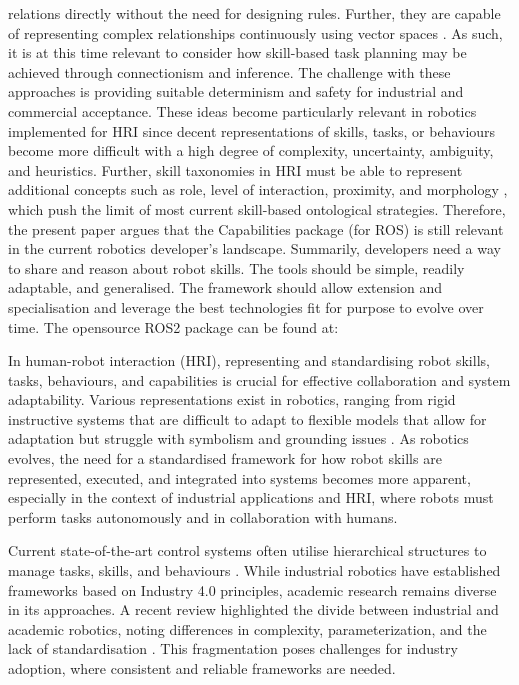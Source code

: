 \documentclass[conference]{IEEEtran}
\begin{document}
relations directly without the need for designing rules. Further, they are capable of representing complex relationships continuously using vector spaces \cite{lecun2015deep}. As such, it is at this time relevant to consider how skill-based task planning may be achieved through connectionism and inference. The challenge with these approaches is providing suitable determinism and safety for industrial and commercial acceptance. These ideas become particularly relevant in robotics implemented for HRI since decent representations of skills, tasks, or behaviours become more difficult with a high degree of complexity, uncertainty, ambiguity, and heuristics. Further, skill taxonomies in HRI must be able to represent additional concepts such as role, level of interaction, proximity, and morphology \cite{yanco2004classifying}, which push the limit of most current skill-based ontological strategies. Therefore, the present paper argues that the Capabilities package (for ROS) is still relevant in the current robotics developer’s landscape. Summarily, developers need a way to share and reason about robot skills.  The tools should be simple, readily adaptable, and generalised. The framework should allow extension and specialisation and leverage the best technologies fit for purpose to evolve over time. The opensource ROS2 package can be found at: 

In human-robot interaction (HRI), representing and standardising robot skills, tasks, behaviours, and capabilities is crucial for effective collaboration and system adaptability. Various representations exist in robotics, ranging from rigid instructive systems that are difficult to adapt to flexible models that allow for adaptation but struggle with symbolism and grounding issues \cite{chen2024language, olivares2019review}. As robotics evolves, the need for a standardised framework for how robot skills are represented, executed, and integrated into systems becomes more apparent, especially in the context of industrial applications and HRI, where robots must perform tasks autonomously and in collaboration with humans.

Current state-of-the-art control systems often utilise hierarchical structures to manage tasks, skills, and behaviours \cite{mayr2023skiros2}. While industrial robotics have established frameworks based on Industry 4.0 principles, academic research remains diverse in its approaches. A recent review highlighted the divide between industrial and academic robotics, noting differences in complexity, parameterization, and the lack of standardisation \cite{pantano2022capability}. This fragmentation poses challenges for industry adoption, where consistent and reliable frameworks are needed.
\end{document}
